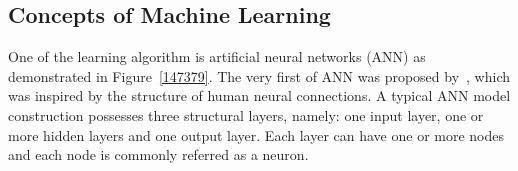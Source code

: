 \subsection{Concepts of Machine Learning}
One of the learning algorithm is artificial neural networks (ANN) as demonstrated in Figure~\ref{147379}. The very first of ANN was proposed by~\citet{McCulloch_1943}, which was inspired by the structure of human neural connections. A typical ANN model construction possesses three structural layers, namely: one input layer, one or more hidden layers and one output layer. Each layer can have one or more nodes and each node is commonly referred as a neuron. 